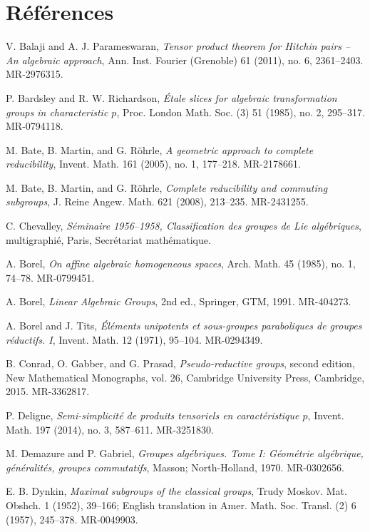 \documentclass[11pt]{article}
\begin{document}
\section*{Références}
\begin{description}[leftmargin=2.7cm,labelwidth=2.2cm,style=nextline]
\item[{[BP]}] V. Balaji and A. J. Parameswaran, \emph{Tensor product theorem for Hitchin pairs -- An algebraic approach}, Ann. Inst. Fourier (Grenoble) 61 (2011), no. 6, 2361--2403. MR-2976315.
\item[{[BR]}] P. Bardsley and R. W. Richardson, \emph{Étale slices for algebraic transformation groups in characteristic \(p\)}, Proc. London Math. Soc. (3) 51 (1985), no. 2, 295--317. MR-0794118.
\item[{[BMR1]}] M. Bate, B. Martin, and G. Röhrle, \emph{A geometric approach to complete reducibility}, Invent. Math. 161 (2005), no. 1, 177--218. MR-2178661.
\item[{[BMR2]}] M. Bate, B. Martin, and G. Röhrle, \emph{Complete reducibility and commuting subgroups}, J. Reine Angew. Math. 621 (2008), 213--235. MR-2431255.
\item[{[Bible]}] C. Chevalley, \emph{Séminaire 1956--1958, Classification des groupes de Lie algébriques}, multigraphié, Paris, Secrétariat mathématique.
\item[{[Bo]}] A. Borel, \emph{On affine algebraic homogeneous spaces}, Arch. Math. 45 (1985), no. 1, 74--78. MR-0799451.
\item[{[Bo2]}] A. Borel, \emph{Linear Algebraic Groups}, 2nd ed., Springer, GTM, 1991. MR-404273.
\item[{[BT]}] A. Borel and J. Tits, \emph{Éléments unipotents et sous-groupes paraboliques de groupes réductifs. I}, Invent. Math. 12 (1971), 95--104. MR-0294349.
\item[{[CGP]}] B. Conrad, O. Gabber, and G. Prasad, \emph{Pseudo-reductive groups}, second edition, New Mathematical Monographs, vol. 26, Cambridge University Press, Cambridge, 2015. MR-3362817.
\item[{[D]}] P. Deligne, \emph{Semi-simplicité de produits tensoriels en caractéristique \(p\)}, Invent. Math. 197 (2014), no. 3, 587--611. MR-3251830.
\item[{[DG]}] M. Demazure and P. Gabriel, \emph{Groupes algébriques. Tome I: Géométrie algébrique, généralités, groupes commutatifs}, Masson; North-Holland, 1970. MR-0302656.
\item[{[Dy]}] E. B. Dynkin, \emph{Maximal subgroups of the classical groups}, Trudy Moskov. Mat. Obshch. 1 (1952), 39--166; English translation in Amer. Math. Soc. Transl. (2) 6 (1957), 245--378. MR-0049903.

\end{description}
\end{document}
